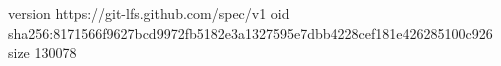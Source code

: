 version https://git-lfs.github.com/spec/v1
oid sha256:8171566f9627bcd9972fb5182e3a1327595e7dbb4228cef181e426285100c926
size 130078
